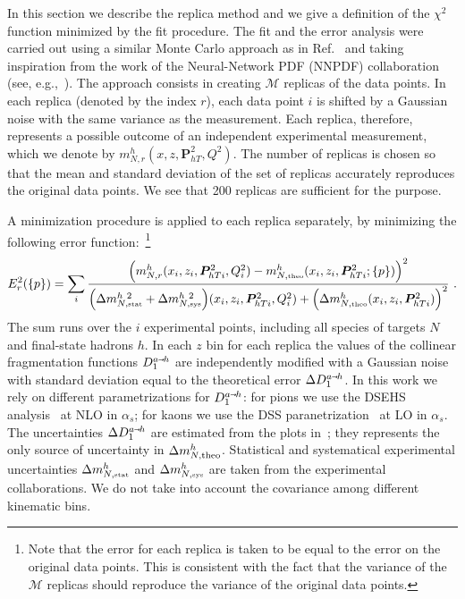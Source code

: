 \documentclass[aps,preprintnumbers,showpacs,nofootinbib,superscriptaddress,floatfix]{revtex4}
\newcommand{\smarrow}{\mbox{\raisebox{-4.5pt}[0pt][0pt]{$\hspace{-1pt} 
		\vec{\phantom{v}}$}}}
\newcommand{\Tperp}{T}
\begin{document}
In this section we describe the replica method and we give a definition of the $\chi^2$ function minimized by the fit procedure.
The fit and the error analysis were carried out using a similar Monte Carlo approach as in Ref.~\cite{Bacchetta:2012ty,Signori:2013mda,Radici:2015mwa} and taking
inspiration from the work of the Neural-Network PDF (NNPDF) collaboration (see, e.g.,~\cite{Forte:2002fg,Ball:2008by,Ball:2010de}). 
The approach consists in creating $\mathcal{M}$ replicas of the data points. In each replica (denoted by the index $r$), each data point $i$ is shifted by a Gaussian noise with the same variance as the measurement. 
Each replica, therefore, represents a possible outcome of an independent experimental measurement, which we denote by $m_{N, r}^{h}(x, z, \bm{P}_{h\Tperp}^2, Q^2)$. 
The number of replicas is chosen so that the mean and standard deviation of the set of replicas accurately reproduces the original data points. We see that 200 replicas are sufficient for the purpose.

A minimization procedure is applied to each replica separately, by minimizing the following error function:~\footnote{Note that the error for each replica is taken to be equal to the error on the original data points. This is consistent with the fact that the variance of the $\mathcal{M}$ replicas should reproduce the variance of the original data points.}  
\begin{equation}
E_r^2(\{p\})=\sum_{i} 
\frac{\Bigl(m_{N, r}^{h}(x_i, z_i, \bm{P}_{h\Tperp i}^2, Q_i^2) - m_{N,  \mbox{\tiny theo}}^{h}(x_i, z_i, \bm{P}_{h\Tperp i}^2; \{p\})\Bigr)^2}
        {\Bigl( \Delta m_{N, \mbox{\tiny stat}}^{h\ 2} + \Delta m_{N, \mbox{\tiny sys}}^{h\ 2} \Bigr)(x_i, z_i, \bm{P}_{h\Tperp i}^2, Q^2_i) +\Bigl(\Delta m_{N, \mbox{\tiny theo}}^{h}(x_i, z_i, \bm{P}_{h\Tperp i}^2) \Bigr)^2}\  . 
\label{e:MC_chi2}
\end{equation}
The sum runs over the $i$ experimental points, including all species of targets $N$ and final-state hadrons $h$. 
In each $z$ bin for each replica the values of the collinear fragmentation functions $D_1^{a \smarrow h}$ are independently modified with a Gaussian noise with standard deviation equal to the theoretical error $\Delta D_1^{a\smarrow h}$. 
In this work we rely on different parametrizations for $D_1^{a \smarrow h}$: for pions we use the DSEHS analysis~\cite{deFlorian:2014xna} at NLO in $\alpha_s$; for kaons we use the DSS paranetrization~\cite{deFlorian:2007aj} at LO in $\alpha_s$. 
The uncertainties $\Delta D_1^{a\smarrow h}$ are estimated from the plots in~\cite{Epele:2012vg}; they represents the only source of uncertainty in $\Delta m_{N,  {\rm theo}}^{h}$. 
Statistical and systematical experimental uncertainties $\Delta m_{N, \mbox{\tiny stat}}^{h}$ and $\Delta m_{N, \mbox{\tiny sys}}^{h}$ are taken from the experimental collaborations. 
We do not take into account the covariance among different kinematic bins. 
\end{document}
